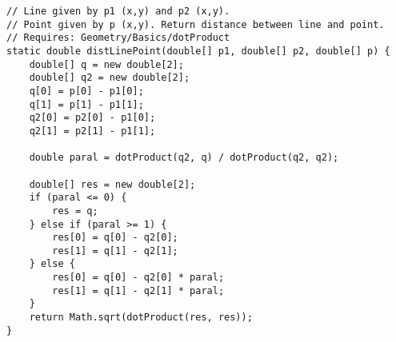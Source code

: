 \begin{verbatim}
// Line given by p1 (x,y) and p2 (x,y).
// Point given by p (x,y). Return distance between line and point.
// Requires: Geometry/Basics/dotProduct
static double distLinePoint(double[] p1, double[] p2, double[] p) {
	double[] q = new double[2];
	double[] q2 = new double[2];
	q[0] = p[0] - p1[0];
	q[1] = p[1] - p1[1];
	q2[0] = p2[0] - p1[0];
	q2[1] = p2[1] - p1[1];

	double paral = dotProduct(q2, q) / dotProduct(q2, q2);

	double[] res = new double[2];
	if (paral <= 0) {
		res = q;
	} else if (paral >= 1) {
		res[0] = q[0] - q2[0];
		res[1] = q[1] - q2[1];
	} else {
		res[0] = q[0] - q2[0] * paral;
		res[1] = q[1] - q2[1] * paral;
	}
	return Math.sqrt(dotProduct(res, res));
}
\end{verbatim}